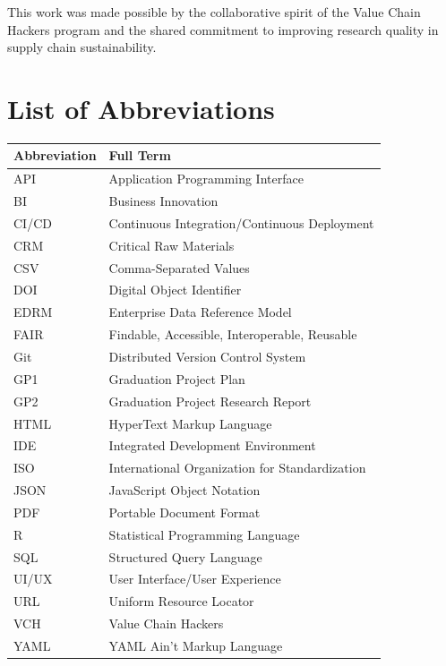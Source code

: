 \documentclass[
  oneside,
  open=any]{scrbook}
\begin{document}
This work was made possible by the collaborative spirit of the Value
Chain Hackers program and the shared commitment to improving research
quality in supply chain sustainability.

\newpage

\chapter*{List of Abbreviations}\label{list-of-abbreviations}

\begin{longtable}[]{@{}ll@{}}
\toprule\noalign{}
Abbreviation & Full Term \\
\midrule\noalign{}
\endhead
\bottomrule\noalign{}
\endlastfoot
API & Application Programming Interface \\
BI & Business Innovation \\
CI/CD & Continuous Integration/Continuous Deployment \\
CRM & Critical Raw Materials \\
CSV & Comma-Separated Values \\
DOI & Digital Object Identifier \\
EDRM & Enterprise Data Reference Model \\
FAIR & Findable, Accessible, Interoperable, Reusable \\
Git & Distributed Version Control System \\
GP1 & Graduation Project Plan \\
GP2 & Graduation Project Research Report \\
HTML & HyperText Markup Language \\
IDE & Integrated Development Environment \\
ISO & International Organization for Standardization \\
JSON & JavaScript Object Notation \\
PDF & Portable Document Format \\
R & Statistical Programming Language \\
SQL & Structured Query Language \\
UI/UX & User Interface/User Experience \\
URL & Uniform Resource Locator \\
VCH & Value Chain Hackers \\
YAML & YAML Ain't Markup Language \\
\end{longtable}
\end{document}
